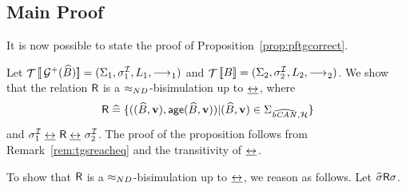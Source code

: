 \subsection*{Main Proof}
It is now possible to state the proof of Proposition~\ref{prop:pftgcorrect}.

Let $\TSys{\GrPlus(\csys)} = (\States_1,\Init_1,\Labels_1,\TRel_1)$ and
$\TSys{\sys} = (\States_2,\Init_2,\Labels_2,\TRel_2)$.
We show that the relation ${\sf R}$ is a $\approx_{ND}$-bisimulation up to
$\mathrel{\underline{\leftrightarrow}^{}_{}}$, where
\[\birel \defs \{((\csys,\clkvl),\age(\csys,\clkvl)) | (\csys,\clkvl) \in 
  \States_{\CSys{},\clocks}\}\]
and $\Init_1 \bisim\birel\bisim \Init_2$. The proof of the proposition follows
from Remark~\ref{rem:tgsreacheq} and the transitivity of $\mathrel{\underline{\leftrightarrow}^{}_{}}$.
  
To show that ${\sf R}$ is a $\approx_{ND}$-bisimulation up to $\mathrel{\underline{\leftrightarrow}^{}_{}}$, we
reason as follows.  Let $\widehat{\sigma} {\sf R} \sigma$.
